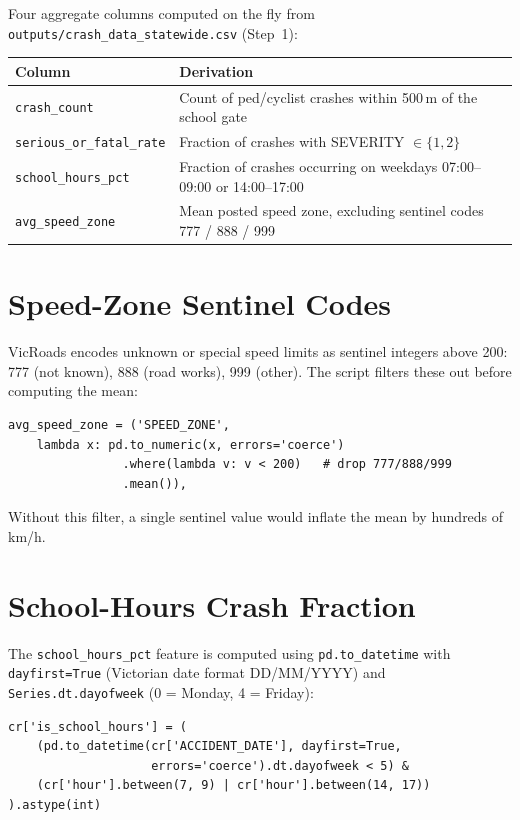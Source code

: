 \documentclass[11pt,a4paper,openany]{book}
\begin{document}
Four aggregate columns computed on the fly from
\texttt{outputs/crash\_data\_statewide.csv} (Step~1):

\begin{center}
\begin{tabular}{lL{8cm}}
\toprule
Column & Derivation \\
\midrule
\texttt{crash\_count} & Count of ped/cyclist crashes within 500\,m of the school gate \\
\texttt{serious\_or\_fatal\_rate} & Fraction of crashes with SEVERITY $\in \{1,2\}$ \\
\texttt{school\_hours\_pct} & Fraction of crashes occurring on weekdays 07:00--09:00 or 14:00--17:00 \\
\texttt{avg\_speed\_zone} & Mean posted speed zone, excluding sentinel codes 777 / 888 / 999 \\
\bottomrule
\end{tabular}
\end{center}

\section{Speed-Zone Sentinel Codes}

VicRoads encodes unknown or special speed limits as sentinel integers above 200:
777 (not known), 888 (road works), 999 (other).  The script filters these out before
computing the mean:

\begin{lstlisting}[style=python, caption={Sentinel code filtering in crash aggregation.}]
avg_speed_zone = ('SPEED_ZONE',
    lambda x: pd.to_numeric(x, errors='coerce')
                .where(lambda v: v < 200)   # drop 777/888/999
                .mean()),
\end{lstlisting}

Without this filter, a single sentinel value would inflate the mean by hundreds of km/h.

\section{School-Hours Crash Fraction}

The \texttt{school\_hours\_pct} feature is computed using \texttt{pd.to\_datetime} with
\texttt{dayfirst=True} (Victorian date format DD/MM/YYYY) and \texttt{Series.dt.dayofweek}
(0 = Monday, 4 = Friday):

\begin{lstlisting}[style=python, caption={School-hours flag derivation in feature\_engineering.py.}]
cr['is_school_hours'] = (
    (pd.to_datetime(cr['ACCIDENT_DATE'], dayfirst=True,
                    errors='coerce').dt.dayofweek < 5) &
    (cr['hour'].between(7, 9) | cr['hour'].between(14, 17))
).astype(int)
\end{lstlisting}
\end{document}
